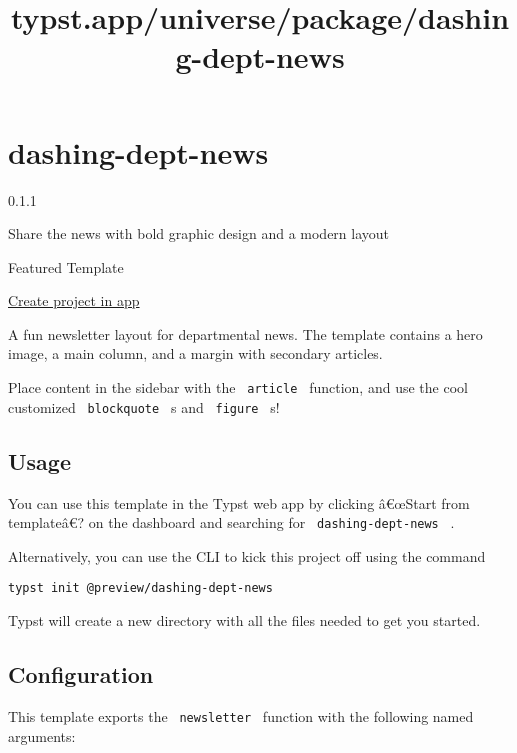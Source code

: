 \title{typst.app/universe/package/dashing-dept-news}

\label{banner}
\label{template-thumbnail}

\section{dashing-dept-news}\label{dashing-dept-news}

{ 0.1.1 }

Share the news with bold graphic design and a modern layout

{ } Featured Template

\href{/app?template=dashing-dept-news&version=0.1.1}{Create project in
app}

\label{readme}
A fun newsletter layout for departmental news. The template contains a
hero image, a main column, and a margin with secondary articles.

Place content in the sidebar with the \texttt{\ article\ } function, and
use the cool customized \texttt{\ blockquote\ } s and
\texttt{\ figure\ } s!

\subsection{Usage}\label{usage}

You can use this template in the Typst web app by clicking â€œStart from
templateâ€? on the dashboard and searching for
\texttt{\ dashing-dept-news\ } .

Alternatively, you can use the CLI to kick this project off using the
command

\begin{verbatim}
typst init @preview/dashing-dept-news
\end{verbatim}

Typst will create a new directory with all the files needed to get you
started.

\subsection{Configuration}\label{configuration}

This template exports the \texttt{\ newsletter\ } function with the
following named arguments:

